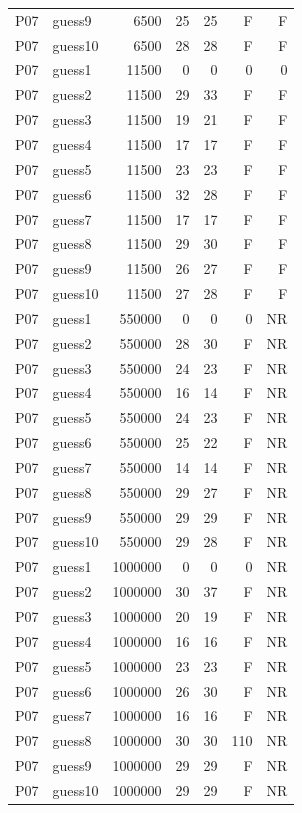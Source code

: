 {\begin{longtable}{llrrrrr}
P07 & guess9 & 6500 & 25 & 25 & F & F \\
P07 & guess10 & 6500 & 28 & 28 & F & F \\
P07 & guess1 & 11500 & 0 & 0 & 0 & 0 \\
P07 & guess2 & 11500 & 29 & 33 & F & F \\
P07 & guess3 & 11500 & 19 & 21 & F & F \\
P07 & guess4 & 11500 & 17 & 17 & F & F \\
P07 & guess5 & 11500 & 23 & 23 & F & F \\
P07 & guess6 & 11500 & 32 & 28 & F & F \\
P07 & guess7 & 11500 & 17 & 17 & F & F \\
P07 & guess8 & 11500 & 29 & 30 & F & F \\
P07 & guess9 & 11500 & 26 & 27 & F & F \\
P07 & guess10 & 11500 & 27 & 28 & F & F \\
P07 & guess1 & 550000 & 0 & 0 & 0 & NR \\
P07 & guess2 & 550000 & 28 & 30 & F & NR \\
P07 & guess3 & 550000 & 24 & 23 & F & NR \\
P07 & guess4 & 550000 & 16 & 14 & F & NR \\
P07 & guess5 & 550000 & 24 & 23 & F & NR \\
P07 & guess6 & 550000 & 25 & 22 & F & NR \\
P07 & guess7 & 550000 & 14 & 14 & F & NR \\
P07 & guess8 & 550000 & 29 & 27 & F & NR \\
P07 & guess9 & 550000 & 29 & 29 & F & NR \\
P07 & guess10 & 550000 & 29 & 28 & F & NR \\
P07 & guess1 & 1000000 & 0 & 0 & 0 & NR \\
P07 & guess2 & 1000000 & 30 & 37 & F & NR \\
P07 & guess3 & 1000000 & 20 & 19 & F & NR \\
P07 & guess4 & 1000000 & 16 & 16 & F & NR \\
P07 & guess5 & 1000000 & 23 & 23 & F & NR \\
P07 & guess6 & 1000000 & 26 & 30 & F & NR \\
P07 & guess7 & 1000000 & 16 & 16 & F & NR \\
P07 & guess8 & 1000000 & 30 & 30 & 110 & NR \\
P07 & guess9 & 1000000 & 29 & 29 & F & NR \\
P07 & guess10 & 1000000 & 29 & 29 & F & NR \\

\end{longtable}}
